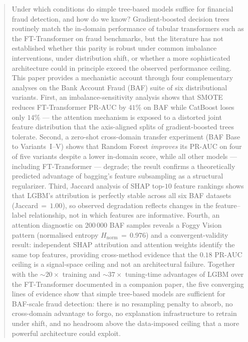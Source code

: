 \documentclass[a4paper,fleqn]{cas-sc}
\begin{document}
\begin{abstract}
Under which conditions do simple tree-based models suffice for financial fraud
detection, and how do we know? Gradient-boosted decision trees routinely match
the in-domain performance of tabular transformers such as the FT-Transformer
on fraud benchmarks, but the literature has not established whether this parity
is robust under common imbalance interventions, under distribution shift, or
whether a more sophisticated architecture could in principle exceed the
observed performance ceiling.
This paper provides a mechanistic account through four complementary analyses
on the Bank Account Fraud (BAF) suite of six distributional variants.
First, an imbalance-sensitivity analysis shows that SMOTE reduces FT-Transformer
PR-AUC by $41\%$ on BAF while CatBoost loses only $14\%$ ---
the attention mechanism is exposed to a distorted joint feature distribution
that the axis-aligned splits of gradient-boosted trees tolerate.
Second, a zero-shot cross-domain transfer experiment (BAF Base to Variants~I--V)
shows that Random Forest \emph{improves} its PR-AUC on four of five variants
despite a lower in-domain score, while all other models --- including FT-Transformer
--- degrade; the result confirms a theoretically predicted advantage of bagging's
feature subsampling as a structural regularizer.
Third, Jaccard analysis of SHAP top-$10$ feature rankings shows that LGBM's
attribution is perfectly stable across all six BAF datasets
(Jaccard\,$=\,1.00$), so observed degradation reflects changes in the
feature--label relationship, not in which features are informative.
Fourth, an attention diagnostic on $200\,000$ BAF samples reveals a Foggy Vision
pattern (normalised entropy $H_{\text{norm}}\,=\,0.976$) and a convergent-validity
result: independent SHAP attribution and attention weights identify the same
top features, providing cross-method evidence that the $0.18$ PR-AUC ceiling
is a signal-space ceiling and not an architectural failure.
Together with the $\sim 20\times$ training and $\sim 37\times$ tuning-time
advantages of LGBM over the FT-Transformer documented in a companion paper,
the five converging lines of evidence show that simple tree-based models are
sufficient for BAF-scale fraud detection: there is no resampling penalty to
absorb, no cross-domain advantage to forgo, no explanation infrastructure
to retrain under shift, and no headroom above the data-imposed ceiling that
a more powerful architecture could exploit.
\end{abstract}
\end{document}
